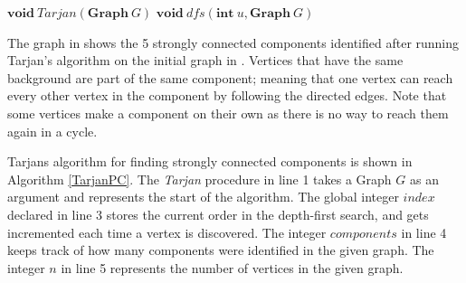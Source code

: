 \documentclass{l4proj}
\begin{document}

\begin{algorithm}[H]
\DontPrintSemicolon
\nl $\textbf{void} ~\mathit{Tarjan}(\textbf{Graph}~G)$ \;
\nl {}
\;
\nl $\textbf{void} ~\mathit{dfs}(\textbf{int}~u, \textbf{Graph}~G)$ \;
\nl {}
\caption{Tarjan\textquotesingle s algorithm \cite{tarjan1972depth} for finding the Strongly Connected Components of a Graph}
\label{TarjanPC}
\end{algorithm}

\noindent The graph in  shows the 5 strongly connected components identified after running Tarjan's algorithm \cite{tarjan1972depth} on the initial graph in . Vertices that have the same background are part of the same component; meaning that one vertex can reach every other vertex in the component by following the directed edges. Note that some vertices make a component on their own as there is no way to reach them again in a cycle.

\noindent Tarjan\textquotesingle s algorithm \cite{tarjan1972depth} for finding strongly connected components is shown in Algorithm \ref{TarjanPC}. The \textit{Tarjan} procedure in line 1 takes a Graph $G$ as an argument and represents the start of the algorithm. The global integer $index$ declared in line 3 stores the current order in the depth-first search, and gets incremented each time a vertex is discovered. The integer $components$ in line 4 keeps track of how many components were identified in the given graph. The integer $n$ in line 5 represents the number of vertices in the given graph.
\end{document}
